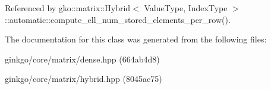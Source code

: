 Referenced by gko\+::matrix\+::\+Hybrid$<$ Value\+Type, Index\+Type $>$\+::automatic\+::compute\+\_\+ell\+\_\+num\+\_\+stored\+\_\+elements\+\_\+per\+\_\+row().



The documentation for this class was generated from the following files\+:\begin{DoxyCompactItemize}
\item 
ginkgo/core/matrix/dense.\+hpp (664ab4d8)\item 
ginkgo/core/matrix/hybrid.\+hpp (8045ac75)\end{DoxyCompactItemize}
